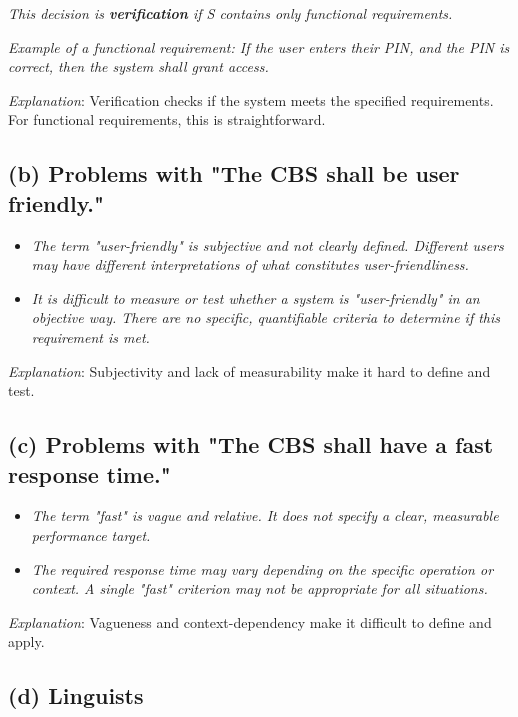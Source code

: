 \documentclass{article}
\begin{document}
\textit{This decision is \textbf{verification} if S contains only functional requirements.}

\textit{Example of a functional requirement: If the user enters their PIN, and the PIN is correct, then the system shall grant access.}

\textit{Explanation}: Verification checks if the system meets the specified requirements. For functional requirements, this is straightforward.

\subsection*{(b) Problems with "The CBS shall be user friendly."}

\begin{itemize}
    \item \textit{The term "user-friendly" is subjective and not clearly defined. Different users may have different interpretations of what constitutes user-friendliness.}
    \item \textit{It is difficult to measure or test whether a system is "user-friendly" in an objective way. There are no specific, quantifiable criteria to determine if this requirement is met.}
\end{itemize}

\textit{Explanation}: Subjectivity and lack of measurability make it hard to define and test.

\subsection*{(c) Problems with "The CBS shall have a fast response time."}

\begin{itemize}
    \item \textit{The term "fast" is vague and relative. It does not specify a clear, measurable performance target.}
    \item \textit{The required response time may vary depending on the specific operation or context. A single "fast" criterion may not be appropriate for all situations.}
\end{itemize}

\textit{Explanation}: Vagueness and context-dependency make it difficult to define and apply.

\subsection*{(d) Linguists}
\end{document}
